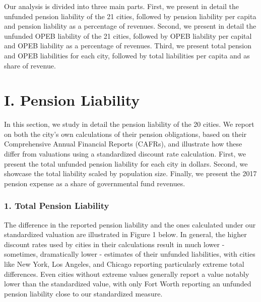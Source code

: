 \documentclass[
]{article}
\begin{document}
Our analysis is divided into three main parts. First, we present in
detail the unfunded pension liability of the 21 cities, followed by
pension liability per capita and pension liability as a percentage of
revenues. Second, we present in detail the unfunded OPEB liability of
the 21 cities, followed by OPEB liability per capital and OPEB liability
as a percentage of revenues. Third, we present total pension and OPEB
liabilities for each city, followed by total liabilities per capita and
as share of revenue.

\hypertarget{i.-pension-liability}{%
\section{I. Pension Liability}\label{i.-pension-liability}}

In this section, we study in detail the pension liability of the 20
cities. We report on both the city's own calculations of their pension
obligations, based on their Comprehensive Annual Financial Reports
(CAFRs), and illustrate how these differ from valuations using a
standardized discount rate calculation. First, we present the total
unfunded pension liability for each city in dollars. Second, we showcase
the total liability scaled by population size. Finally, we present the
2017 pension expense as a share of governmental fund revenues.

\hypertarget{total-pension-liability}{%
\subsubsection{1. Total Pension
Liability}\label{total-pension-liability}}

The difference in the reported pension liability and the ones calculated
under our standardized valuation are illustrated in Figure 1 below. In
general, the higher discount rates used by cities in their calculations
result in much lower - sometimes, dramatically lower - estimates of
their unfunded liabilities, with cities like New York, Los Angeles, and
Chicago reporting particularly extreme total differences. Even cities
without extreme values generally report a value notably lower than the
standardized value, with only Fort Worth reporting an unfunded pension
liability close to our standardized measure.
\end{document}
